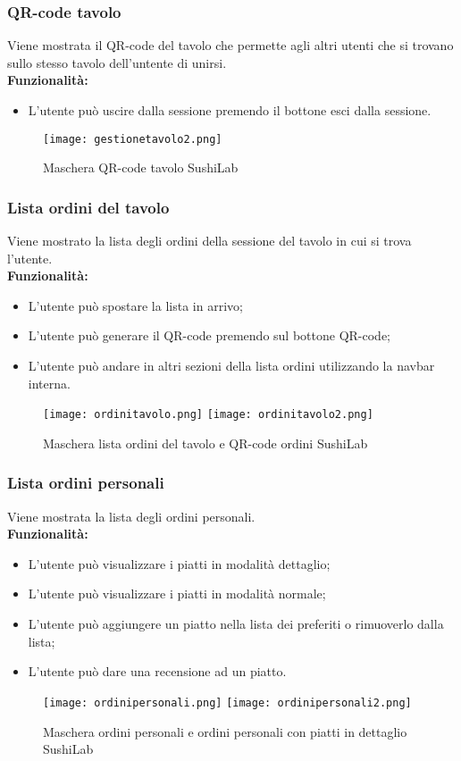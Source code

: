 \subsubsection{QR-code tavolo}
Viene mostrata il QR-code del tavolo che permette agli altri utenti che si trovano sullo stesso tavolo dell'untente di unirsi.\\
\textbf{Funzionalità:}
\begin{itemize}
    \item L'utente può uscire dalla sessione premendo il bottone esci dalla sessione.
\end{itemize}
\begin{figure}[H]
    \centering
    \texttt{[image: gestionetavolo2.png]}
    \caption{Maschera QR-code tavolo SushiLab}
\end{figure}
\pagebreak

\subsubsection{Lista ordini del tavolo}
Viene mostrato la lista degli ordini della sessione del tavolo in cui si trova l'utente.\\
\textbf{Funzionalità:}
\begin{itemize}
    \item L'utente può spostare la lista in arrivo;
    \item L'utente può generare il QR-code premendo sul bottone QR-code;
    \item L'utente può andare in altri sezioni della lista ordini utilizzando la navbar interna.
\end{itemize}
\begin{figure}[H]
    \centering
    \texttt{[image: ordinitavolo.png]}
    \texttt{[image: ordinitavolo2.png]}
    \caption{Maschera lista ordini del tavolo e QR-code ordini SushiLab}
\end{figure}
\pagebreak

\subsubsection{Lista ordini personali}
Viene mostrata la lista degli ordini personali.\\
\textbf{Funzionalità:}
\begin{itemize}
    \item L'utente può visualizzare i piatti in modalità dettaglio;
    \item L'utente può visualizzare i piatti in modalità normale;
    \item L'utente può aggiungere un piatto nella lista dei preferiti o rimuoverlo dalla lista;
    \item L'utente può dare una recensione ad un piatto.
\end{itemize}
\begin{figure}[H]
    \centering
    \texttt{[image: ordinipersonali.png]}
    \texttt{[image: ordinipersonali2.png]}
    \caption{Maschera ordini personali e ordini personali con piatti in dettaglio SushiLab}
\end{figure}
\pagebreak

